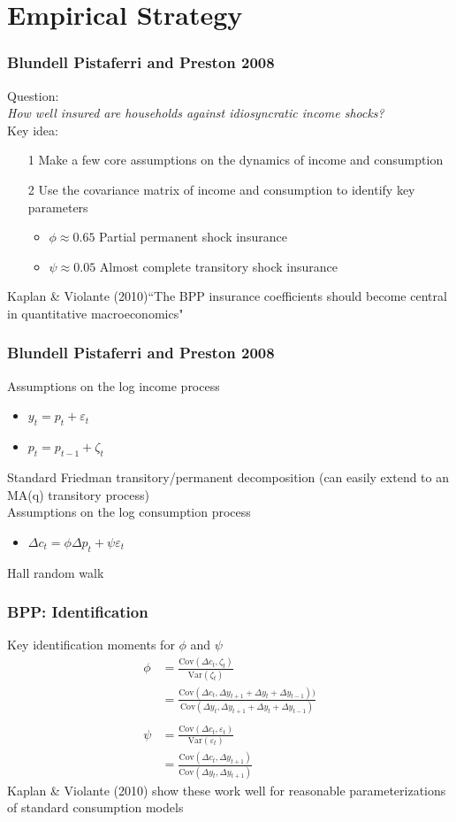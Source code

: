 \documentclass{beamer}
\begin{document}
\section{Empirical Strategy}
\frame
{
	\frametitle{Blundell Pistaferri and Preston 2008}
	Question:\\
	\bigskip
	\qquad \textit{How well insured are households against idiosyncratic income shocks?}\\
	\bigskip
	Key idea: 
	\begin{itemize}
		\item[1] Make a few core assumptions on the dynamics of income and consumption
		\item[2] Use the covariance matrix of income and consumption to identify key parameters
		\begin{itemize}
			\item $\phi \approx 0.65$ Partial permanent shock insurance
			\item $\psi \approx 0.05$ Almost complete transitory shock insurance
		\end{itemize}
	\end{itemize}
	\pause
	Kaplan \& Violante (2010)``The BPP insurance coefficients should become central in quantitative macroeconomics"
}
\frame
{
	\frametitle{Blundell Pistaferri and Preston 2008}
	Assumptions on the log income process
	\begin{itemize}
		\item $y_t = p_t + \varepsilon_t$
		\item $p_t = p_{t-1} + \zeta_t$
	\end{itemize}
	Standard Friedman transitory/permanent decomposition (can easily extend to an MA(q) transitory process)\\
	\pause
	\bigskip
	Assumptions on the log consumption process
	\begin{itemize}
		\item $\Delta c_t = \phi \Delta p_t + \psi \varepsilon_t$
	\end{itemize}
	Hall random walk\\
}
\frame
{
	\frametitle{BPP: Identification}
	Key identification moments for $\phi$ and $\psi$
	\begin{align*}
		\phi &= \frac{\mathrm{Cov}(\Delta c_t, \zeta_t)}{\mathrm{Var}(\zeta_t)}\\
		     &= \frac{\mathrm{Cov}(\Delta c_t, \Delta y_{t+1}+ \Delta y_t+ \Delta y_{t-1}))}{\mathrm{Cov}(\Delta y_t, \Delta y_{t+1}+ \Delta y_t+ \Delta y_{t-1})}\\
		\\
		\psi &= \frac{\mathrm{Cov}(\Delta c_t, \varepsilon_t)}{\mathrm{Var}(\varepsilon_t)}\\
		&= \frac{\mathrm{Cov}(\Delta c_t, \Delta y_{t+1})}{\mathrm{Cov}( \Delta y_t, \Delta y_{t+1})}
	\end{align*}
		Kaplan \& Violante (2010) show these work well for reasonable parameterizations of standard consumption models
}
\end{document}
